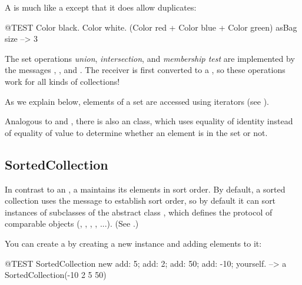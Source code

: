 \documentclass[a4paper,10pt,twoside]{book}
\begin{document}
A  is much like a  except that it does allow duplicates:
\begin{code}{@TEST}
{Color black. Color white. (Color red + Color blue + Color green)} asBag size --> 3
\end{code}

The set operations \emph{union}, \emph{intersection}, and \emph{membership test} are implemented by the  messages , , and .
The receiver is first converted to a , so these operations work for all kinds of collections!


As we explain below, elements of a set are accessed using iterators (see ).

Analogous to  and , there is also an  class, which uses equality of identity instead of equality of value to determine whether an element is in the set or not.

\subsection{SortedCollection}
In contrast to an , a  maintains its elements in sort order.
By default, a sorted collection uses the message  to establish sort order, so by default it can sort instances of subclasses of the abstract class , which defines the protocol of comparable objects (, , , , ...).
(See .)

You can create a  by creating a new instance and adding elements to it:
\begin{code}{@TEST}
SortedCollection new add: 5; add: 2; add: 50; add: -10; yourself. --> a SortedCollection(-10 2 5 50)
\end{code}
\end{document}
